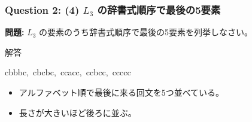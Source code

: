\begin{frame}
  \frametitle{Question 2: (4) $L_3$ の辞書式順序で最後の5要素}
  \textbf{問題:} $L_3$ の要素のうち辞書式順序で最後の5要素を列挙しなさい。
  
  \begin{alertblock}{解答}
      \begin{center}
        cbbbc,\ cbcbc,\ ccacc,\ ccbcc,\ ccccc
      \end{center}
  \end{alertblock}

  \begin{itemize}
    \item アルファベット順で最後に来る回文を5つ並べている。
    \item 長さが大きいほど後ろに並ぶ。
  \end{itemize}
\end{frame}
